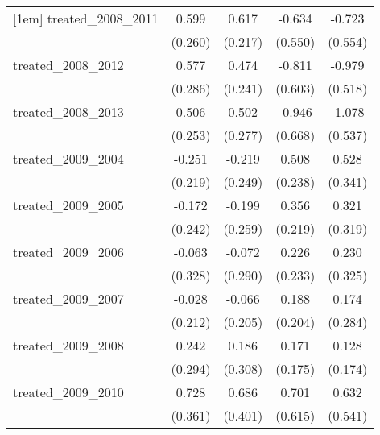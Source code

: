 {\begin{tabular}{l*{4}{c}}
[1em]
treated\_2008\_2011&       0.599\sym{*}  &       0.617\sym{**} &      -0.634         &      -0.723         \\
            &     (0.260)         &     (0.217)         &     (0.550)         &     (0.554)         \\
[1em]
treated\_2008\_2012&       0.577\sym{*}  &       0.474\sym{*}  &      -0.811         &      -0.979         \\
            &     (0.286)         &     (0.241)         &     (0.603)         &     (0.518)         \\
[1em]
treated\_2008\_2013&       0.506\sym{*}  &       0.502         &      -0.946         &      -1.078\sym{*}  \\
            &     (0.253)         &     (0.277)         &     (0.668)         &     (0.537)         \\
[1em]
treated\_2009\_2004&      -0.251         &      -0.219         &       0.508\sym{*}  &       0.528         \\
            &     (0.219)         &     (0.249)         &     (0.238)         &     (0.341)         \\
[1em]
treated\_2009\_2005&      -0.172         &      -0.199         &       0.356         &       0.321         \\
            &     (0.242)         &     (0.259)         &     (0.219)         &     (0.319)         \\
[1em]
treated\_2009\_2006&      -0.063         &      -0.072         &       0.226         &       0.230         \\
            &     (0.328)         &     (0.290)         &     (0.233)         &     (0.325)         \\
[1em]
treated\_2009\_2007&      -0.028         &      -0.066         &       0.188         &       0.174         \\
            &     (0.212)         &     (0.205)         &     (0.204)         &     (0.284)         \\
[1em]
treated\_2009\_2008&       0.242         &       0.186         &       0.171         &       0.128         \\
            &     (0.294)         &     (0.308)         &     (0.175)         &     (0.174)         \\
[1em]
treated\_2009\_2010&       0.728\sym{*}  &       0.686         &       0.701         &       0.632         \\
            &     (0.361)         &     (0.401)         &     (0.615)         &     (0.541)         \\

\end{tabular}}
